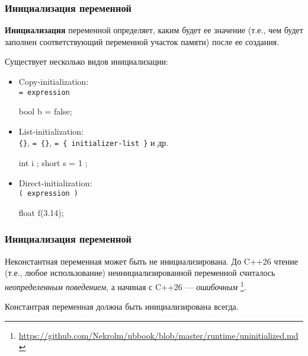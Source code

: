 \documentclass[compress, 8pt]{beamer}
\begin{document}
\begin{frame}[fragile]

    \frametitle{Инициализация переменной}

    \textbf{Инициализация} переменной определяет, каким будет ее значение
    (т.е., чем будет заполнен соответствующий переменной участок памяти)
    после ее создания.

    Существует несколько видов инициализации:

    \begin{itemize}

        \item Copy-initialization: \\ \verb|= expression|
            \begin{myinplacelisting}[minted language=cpp]
bool b = false;
            \end{myinplacelisting}

        \item List-initialization: \\
            \verb|{}|, \verb|= {}|, \verb|= { initializer-list }| и др.
            \begin{myinplacelisting}[minted language=cpp]
int i {};
short s = { 1 };
            \end{myinplacelisting}

        \item Direct-initialization: \\ \verb|( expression )|
            \begin{myinplacelisting}[minted language=cpp]
float f(3.14);
            \end{myinplacelisting}

    \end{itemize}

\end{frame}

\begin{frame}[fragile]

    \frametitle{Инициализация переменной}

    Неконстантная переменная может быть не инициализирована.
    До C++26 чтение (т.е., любое использование) неинициализированной переменной
    считалось \textit{неопределенным поведением}, а начиная с C++26 ---
    \textit{ошибочным}
    \footnote{\url{https://github.com/Nekrolm/ubbook/blob/master/runtime/uninitialized.md}}.

    \hfill \break
    Константрая переменная должна быть инициализирована всегда.

\end{frame}
\end{document}
